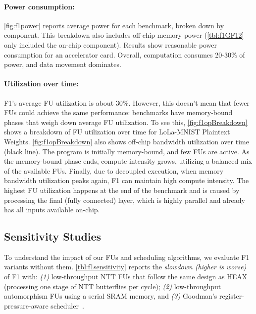 \figFOneDataMovement
\figFOneOpBreakdown

\paragraph{Power consumption:}
\autoref{fig:f1power} reports average power for each benchmark, broken down by
component. This breakdown also includes off-chip memory power
(\autoref{tbl:f1GF12} only included the on-chip component). Results show
reasonable power consumption for an accelerator card. Overall, computation
consumes 20-30\% of power, and data movement dominates.

\paragraph{Utilization over time:}
F1's average FU utilization is about 30\%. However, this doesn't mean that
fewer FUs could achieve the same performance: benchmarks have memory\hyp{}bound
phases that weigh down average FU utilization. To see this,
\autoref{fig:f1opBreakdown} shows a breakdown of FU utilization over time for
LoLa-MNIST Plaintext Weights. \autoref{fig:f1opBreakdown} also shows off-chip
bandwidth utilization over time (black line). The program is initially
memory-bound, and few FUs are active. As the memory-bound phase ends, compute
intensity grows, utilizing a balanced mix of the available FUs. Finally, due to
decoupled execution, when memory bandwidth utilization peaks again, F1 can
maintain high compute intensity. The highest FU utilization happens at the end
of the benchmark and is caused by processing the final (fully connected) layer,
which is highly parallel and already has all inputs available on-chip.

\subsection{Sensitivity Studies}
\label{sec:sensitivity}

\tblFOneSensitivity

To understand the impact of our FUs and scheduling algorithms, we evaluate F1
variants without them. \autoref{tbl:f1sensitivity} reports the \emph{slowdown
(higher is worse)} of F1 with: \emph{(1)} low\hyp{}throughput NTT FUs that
follow the same design as HEAX (processing one stage of NTT butterflies per
cycle); \emph{(2)} low\hyp{}throughput automorphism FUs using a serial SRAM
memory, and \emph{(3)} Goodman's register-pressure-aware
scheduler~\cite{goodman:ics1988:code}.


